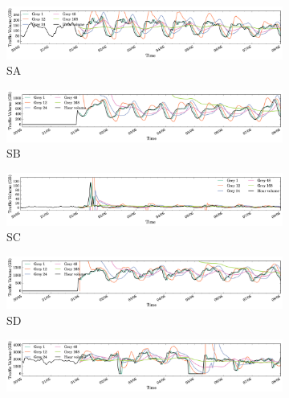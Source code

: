 \begin{figure}
\centering
		\centering
		\begin{subfigure}[b]{0.9\textwidth}
                \includegraphics[width=\textwidth]{gfx/chap2/grey_sa.png}
                \caption{SA}
                \label{fig:grey_sa}
        \end{subfigure}
        \begin{subfigure}[b]{0.9\textwidth}
                \includegraphics[width=\textwidth]{gfx/chap2/grey_sb.png}
                \caption{SB}
                \label{fig:grey_sb}
        \end{subfigure}
        \begin{subfigure}[b]{0.9\textwidth}
                \includegraphics[width=\textwidth]{gfx/chap2/grey_sc.png}
                \caption{SC}
                \label{fig:grey_sc}
        \end{subfigure}
		\centering
        \begin{subfigure}[b]{0.9\textwidth}
                \includegraphics[width=\textwidth]{gfx/chap2/grey_sd.png}
                \caption{SD}
                \label{fig:grey_sd}
        \end{subfigure}
        \begin{subfigure}[b]{0.9\textwidth}
                \includegraphics[width=\textwidth]{gfx/chap2/grey_se.png}

\end{subfigure}
\end{figure}
